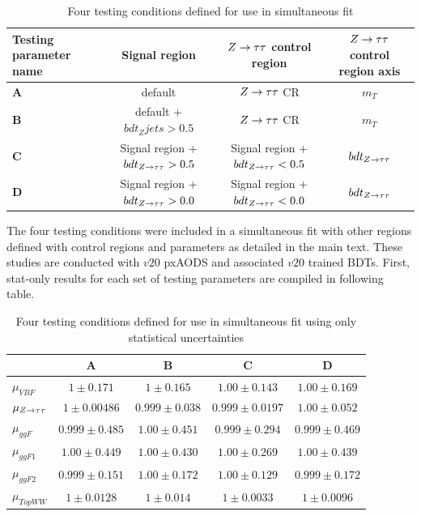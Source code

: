 \begin{table}[h!]
\centering
\begin{tabular}{|l|c|c|c|}
\hline
Testing parameter name      & Signal region   & $Z\rightarrow\tau\tau$ control region & $Z\rightarrow\tau\tau$ control region axis     \\
\hline
\textbf{A}                           & default & $Z\rightarrow\tau\tau$ CR & $m_T$  \\
\textbf{B}                           & default + $bdt_Zjets>0.5$ & $Z\rightarrow\tau\tau$ CR & $m_T$    \\
\textbf{C}                           & Signal region + $bdt_{Z\rightarrow\tau\tau}>0.5$ & Signal region + $bdt_{Z\rightarrow\tau\tau}<0.5$ & $bdt_{Z\rightarrow\tau\tau}$ \\
\textbf{D}			    & Signal region +$bdt_{Z\rightarrow\tau\tau}>0.0$ & Signal region + $bdt_{Z\rightarrow\tau\tau}<0.0$     & $bdt_{Z\rightarrow\tau\tau}$\\
\hline
\end{tabular}
\caption{Four testing conditions defined for use in simultaneous fit}
\label{tab:ZBDTfitconditions}
\end{table}

The four testing conditions were included in a simultaneous fit with other regions defined with control regions and parameters as detailed in the main text. These studies are conducted with $v20$ pxAODS and associated $v20$ trained BDTs. First, stat-only results for each set of testing parameters are compiled in following table. 

\begin{table}[h!]
\centering
\begin{tabular}{|l|c|c|c|c|}
\hline
     & \textbf{A}   & \textbf{B} & \textbf{C} & \textbf{D}     \\
\hline
$\mu_{VBF}$ & $1 \pm 0.171$ &  $1 \pm 0.165$ & $1.00 \pm 0.143$ & $1.00 \pm 0.169$\\
$\mu_{Z\rightarrow\tau\tau}$ & $1 \pm 0.00486$ & $0.999 \pm 0.038$ & $0.999 \pm 0.0197$ & $1.00\pm 0.052$\\
$\mu_{ggF}$ & $0.999 \pm 0.485$ & $1.00 \pm 0.451$ & $0.999 \pm 0.294$ & $0.999 \pm 0.469$\\
$\mu_{ggF1}$ & $1.00 \pm 0.449$ & $1.00 \pm 0.430$ & $1.00 \pm 0.269$ & $1.00 \pm 0.439$\\
$\mu_{ggF2}$ & $0.999 \pm 0.151$ & $1.00 \pm 0.172$ & $1.00 \pm 0.129$ & $0.999 \pm 0.172$\\
$\mu_{TopWW}$ & $1 \pm 0.0128$ & $1 \pm 0.014$ & $1 \pm 0.0033$ & $1 \pm 0.0096$ \\
\hline
\end{tabular}
\caption{Four testing conditions defined for use in simultaneous fit using only statistical uncertainties}
\label{tab:ZBDTstatonly}
\end{table}
 
